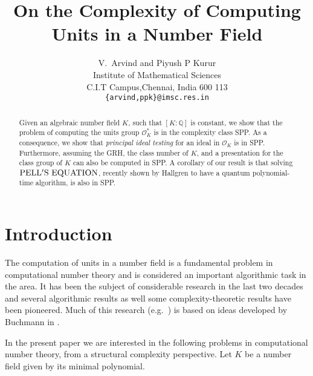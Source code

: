 \documentclass{article}
\title{On the Complexity of Computing Units in a Number Field}
\author{V.~Arvind and Piyush P Kurur\\
  Institute of Mathematical Sciences\\
  C.I.T Campus,Chennai, India 600 113\\
  {\tt \{arvind,ppk\}@imsc.res.in}%
}
\newcommand{\pell}{\ensuremath{\rm PELL'S~EQUATION}}
\theoremstyle{definition}\newtheorem{remark}[theorem]{Remark}
\begin{document}
\maketitle

\begin{abstract}
  Given an algebraic number field $K$, such that $[K:\mathbb{Q}]$ is
  constant, we show that the problem of computing the units group
  $\mathcal{O}^*_K$ is in the complexity class SPP. As a consequence,
  we show that \emph{principal ideal testing} for an ideal in
  $\mathcal{O}_K$ is in SPP. Furthermore, assuming the GRH, the class
  number of $K$, and a presentation for the class group of $K$ can
  also be computed in SPP. A corollary of our result is that solving
  $\pell$, recently shown by Hallgren
  \cite{hallgren:2002:polynomialtime} to have a quantum
  polynomial-time algorithm, is also in SPP.
\end{abstract}

\section{Introduction}\label{one}

The computation of units in a number field is a fundamental problem in
computational number theory and is considered an important algorithmic
task in the area. It has been the subject of considerable research in
the last two decades and several algorithmic results as well some
complexity-theoretic results have been pioneered. Much of this
research (e.g.\ 
\cite{thiel94class,buchmann89quadratic,buchmann88infra}) is based on
ideas developed by Buchmann in
\cite{buchmann87units,buchmann87period}.

In the present paper we are interested in the following problems in
computational number theory, from a structural complexity perspective.
Let $K$ be a number field given by its minimal polynomial.
\end{document}
